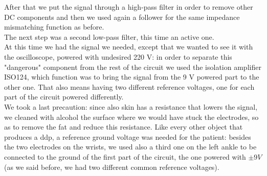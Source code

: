After that we put the signal through a high-pass filter in order to remove other DC components and then we used again a follower for the same impedance mismatching function as before.\\
The next step was a second low-pass filter, this time an active one.\\
At this time we had the signal we needed, except that we wanted to see it with the oscilloscope, powered with undesired 220 V: in order to separate this "dangerous" component from the rest of the circuit we used the isolation amplifier ISO124, which function was to bring the signal from the 9 V powered part to the other one. That also means having two different reference voltages, one for each part of the circuit powered differently.\\
We took a last precaution: since also skin has a resistance that lowers the signal, we cleaned with alcohol the surface where we would have stuck the electrodes, so as to remove the fat and reduce this resistance.
Like every other object that produces a ddp, a reference ground voltage was needed for the patient: besides the two electrodes on the wrists, we used also a third one on the left ankle to be connected to the ground of the first part of the circuit, the one powered with $\pm 9 V$ (as we said before, we had two different common reference voltages).

